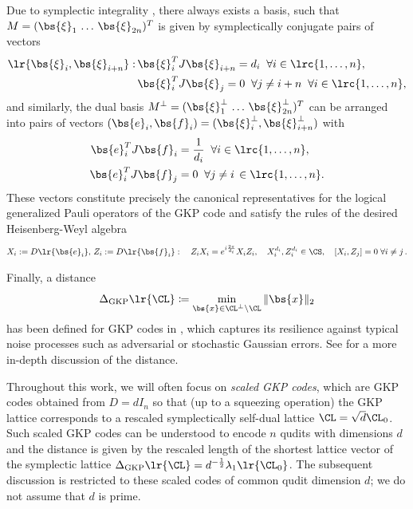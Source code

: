\documentclass[a4paper, aps, pra, 11pt, onecolumn, tightenlines, superscriptaddress]{revtex4-2}
\begin{document}
Due to symplectic integrality \cite{Bourbaki9}, there always exists a basis, such that $M=(\bs{\xi}_1\,\hdots\, \bs{\xi}_{2n} )^T$ is given by symplectically conjugate pairs of vectors
\begin{align}
    \lr{\bs{\xi}_{i}, \bs{\xi}_{i+n}}:\, &\bs{\xi}_{i}^T J\bs{\xi}_{i+n}=d_i \;\;\forall i\in \lrc{1,\hdots, n}, \nonumber \\
    &\bs{\xi}_{i}^T J\bs{\xi}_{j}=0 \;\; \forall j\neq i+n\;\;\forall   i\in \lrc{1,\hdots, n},
\end{align}
and similarly, the dual basis $M^{\perp}=(\bs{\xi}_1^{\perp}\,\hdots\, \bs{\xi}_{2n}^{\perp} )^T$ can be arranged into pairs of vectors $(\bs{e}_i, \bs{f}_i)=(\bs{\xi}^{\perp}_{i}, \bs{\xi}^{\perp}_{i+n})$ with
\begin{align}
\bs{e}_i^T J\bs{f}_{i}&=\frac{1}{d_i} \;\; \forall i\in \lrc{1,\hdots, n} , \nonumber \\
 \bs{e}_i^T J\bs{f}_{j}&=0\;\; \forall  j\neq i\, \in \lrc{1,\hdots, n}.
\end{align}
These vectors constitute precisely the canonical representatives for the logical generalized Pauli operators of the GKP code and satisfy the rules of the desired Heisenberg-Weyl algebra
\begin{align}
\label{eq:HW_operators}
    X_i :=  D\lr{\bs{e}_i}, \, Z_i :=D\lr{\bs{f}_i}: \quad
    Z_iX_i=e^{i\frac{2\pi}{d_i}}X_iZ_i, \quad
    X_i^{d_i}, Z_i^{d_i} \in \CS, \quad
    [X_i, Z_j] =0\;\forall i\neq j\,.  
\end{align}

Finally, a distance 
\begin{equation}
    \Delta_{\rm GKP}\lr{\CL}\coloneqq\min_{\bs{x} \in \CL^{\perp}\setminus \CL} \|\bs{x}\|_2
\end{equation}
has been defined for GKP codes in \cite{Conrad_2022, GKP}, which captures its resilience against typical noise processes such as adversarial or stochastic Gaussian errors. 
See \cite{Conrad_2022,conrad2023good} for a more in-depth discussion of the distance.

Throughout this work, we will often focus on \emph{scaled GKP codes}, which are GKP codes obtained from $D=d I_n$ so that (up to a squeezing operation) the GKP lattice corresponds to a rescaled symplectically self-dual lattice $\CL=\sqrt{d}\CL_0$. 
Such scaled GKP codes can be understood to encode $n$ qudits with dimensions $d$ and the distance is given by the rescaled length of the shortest lattice vector of the symplectic lattice $\Delta_{\rm GKP}\lr{\CL}=d^{-\frac{1}{2}}\lambda_1\lr{\CL_0}$. 
The subsequent discussion is restricted to these scaled codes of common qudit dimension $d$; we do not assume that $d$ is prime.
 
\end{document}
